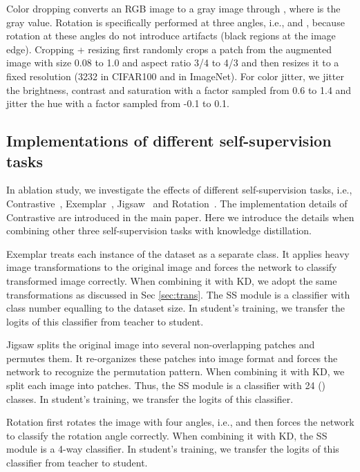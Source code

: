 \documentclass[runningheads]{llncs}
\newcommand{\ie}{i.e.}
\begin{document}
Color dropping converts an RGB image to a gray image through , where  is the gray value. Rotation is specifically performed at three angles, \ie,  and , because rotation at these angles do not introduce artifacts (black regions at the image edge). Cropping + resizing first randomly crops a patch from the augmented image with size 0.08 to 1.0 and aspect ratio 3/4 to 4/3 and then resizes it to a fixed resolution (3232 in CIFAR100 and  in ImageNet). For color jitter, we jitter the brightness, contrast and saturation with a factor sampled from 0.6 to 1.4 and jitter the hue with a factor sampled from -0.1 to 0.1.


\subsection{Implementations of different self-supervision tasks}

In ablation study, we investigate the effects of different self-supervision tasks, \ie, Contrastive~\cite{SimCLR}, Exemplar~\cite{exemplar}, Jigsaw~\cite{jigsaw} and Rotation~\cite{rot2}. The implementation details of Contrastive are introduced in the main paper. Here we introduce the details when combining other three self-supervision tasks with knowledge distillation.

 Exemplar treats each instance of the dataset as a separate class. It applies heavy image transformations to the original image and forces the network to classify transformed image correctly. When combining it with KD, we adopt the same transformations as discussed in Sec \ref{sec:trans}. The SS module is a classifier with class number equalling to the dataset size. In student's training, we transfer the logits of this classifier from teacher to student.

 Jigsaw splits the original image into several non-overlapping patches and permutes them. It re-organizes these patches into image format and forces the network to recognize the permutation pattern. When combining it with KD, we split each image into  patches. Thus, the SS module is a classifier with 24 () classes. In student's training, we transfer the logits of this classifier.

 Rotation first rotates the image with four angles, \ie,  and then forces the network to classify the rotation angle correctly. When combining it with KD, the SS module is a 4-way classifier. In student's training, we transfer the logits of this classifier from teacher to student.
\end{document}
